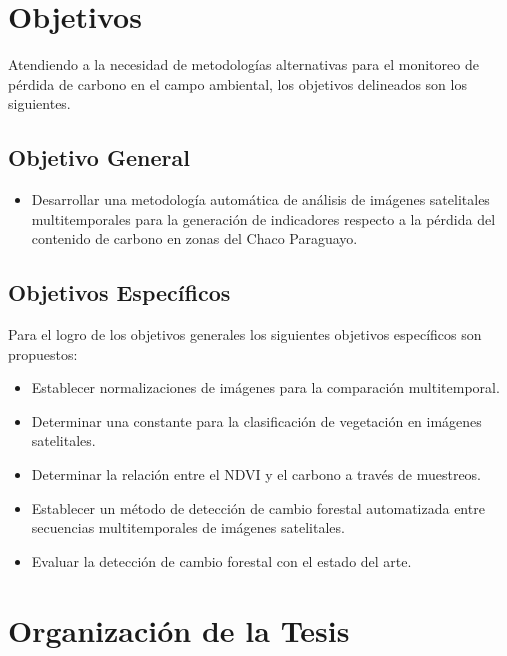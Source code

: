 \section{Objetivos}
Atendiendo a la necesidad de metodolog\'ias alternativas para el monitoreo de p\'erdida de carbono en el campo ambiental, los objetivos delineados son los siguientes.

\subsection{Objetivo General}

\begin{itemize}
\item Desarrollar una metodolog\'ia autom\'atica de an\'alisis de im\'agenes satelitales multitemporales para la generaci\'on de indicadores respecto a la p\'erdida del contenido de carbono en zonas del Chaco Paraguayo.


\end{itemize}
\subsection{Objetivos Espec\'ificos}
Para el logro de los objetivos generales los siguientes objetivos espec\'ificos son propuestos:
\begin{itemize}
\item Establecer normalizaciones de im\'agenes para la comparaci\'on multitemporal. 
\item Determinar una constante para la clasificaci\'on de vegetaci\'on en im\'agenes satelitales.
\item Determinar la relaci\'on entre el NDVI y el carbono a trav\'es de muestreos.
\item Establecer un m\'etodo de detecci\'on de cambio forestal automatizada entre secuencias multitemporales de im\'agenes satelitales. 
\item Evaluar la detecci\'on de cambio forestal con el estado del arte. 
 
    


\end{itemize}



\section{Organizaci\'on de la Tesis}

